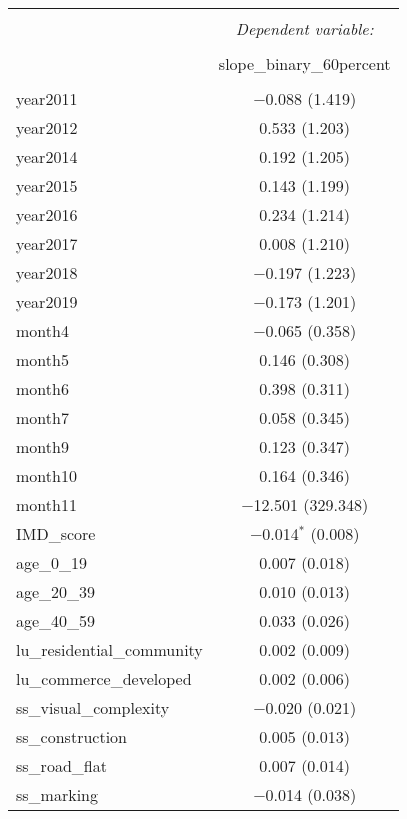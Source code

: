 \begin{table}[!htbp] \centering 
  \caption{} 
  \label{} 
\small 
\begin{tabular}{@{\extracolsep{1pt}}lc} 
\\[-1.8ex]\hline 
\hline \\[-1.8ex] 
 & \multicolumn{1}{c}{\textit{Dependent variable:}} \\ 
\cline{2-2} 
\\[-1.8ex] & slope\_binary\_60percent \\ 
\hline \\[-1.8ex] 
 year2011 & $-$0.088 (1.419) \\ 
  year2012 & 0.533 (1.203) \\ 
  year2014 & 0.192 (1.205) \\ 
  year2015 & 0.143 (1.199) \\ 
  year2016 & 0.234 (1.214) \\ 
  year2017 & 0.008 (1.210) \\ 
  year2018 & $-$0.197 (1.223) \\ 
  year2019 & $-$0.173 (1.201) \\ 
  month4 & $-$0.065 (0.358) \\ 
  month5 & 0.146 (0.308) \\ 
  month6 & 0.398 (0.311) \\ 
  month7 & 0.058 (0.345) \\ 
  month9 & 0.123 (0.347) \\ 
  month10 & 0.164 (0.346) \\ 
  month11 & $-$12.501 (329.348) \\ 
  IMD\_score & $-$0.014$^{*}$ (0.008) \\ 
  age\_0\_19 & 0.007 (0.018) \\ 
  age\_20\_39 & 0.010 (0.013) \\ 
  age\_40\_59 & 0.033 (0.026) \\ 
  lu\_residential\_community & 0.002 (0.009) \\ 
  lu\_commerce\_developed & 0.002 (0.006) \\ 
  ss\_visual\_complexity & $-$0.020 (0.021) \\ 
  ss\_construction & 0.005 (0.013) \\ 
  ss\_road\_flat & 0.007 (0.014) \\ 
  ss\_marking & $-$0.014 (0.038) \\ 

\end{tabular}
\end{table}

